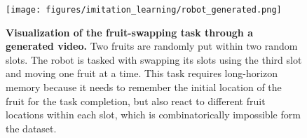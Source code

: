 \begin{figure}[t]
    \centering
    \texttt{[image: figures/imitation\_learning/robot\_generated.png]}
    \vskip -0.1in
    \caption{
        \textbf{Visualization of the fruit-swapping task through a \mtd generated video.} Two fruits are randomly put within two random slots. The robot is tasked with swapping its slots using the third slot and moving one fruit at a time. This task requires long-horizon memory because it needs to remember the initial location of the fruit for the task completion, but also react to different fruit locations within each slot, which is combinatorically impossible form the dataset.
    }
    \label{fig:robot_generated}
    \vskip -0.1in
\end{figure}
